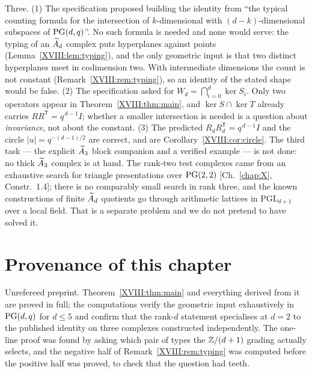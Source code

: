 \begin{remark}\label{XVIII:rem:corrections}
Three. (1) The specification proposed building the identity from ``the typical counting
formula for the intersection of $k$-dimensional with $(d-k)$-dimensional subspaces of
$\mathrm{PG}(d,q)$''. No such formula is needed and none would serve: the typing of an $\widetilde A_{d}$
complex puts hyperplanes against points (Lemma~\ref{XVIII:lem:typing}), and the only geometric
input is that two distinct hyperplanes meet in codimension two. With intermediate
dimensions the count is not constant (Remark~\ref{XVIII:rem:typing}), so an identity of the
stated shape would be false. (2) The specification asked for
$W_d=\bigcap_{i=0}^{d}\ker S_i$. Only two operators appear in Theorem~\ref{XVIII:thm:main}, and
$\ker S\cap\ker T$ already carries $RR^{\mathsf T}=q^{\,d-1}I$; whether a smaller
intersection is needed is a question about \emph{invariance}, not about the constant.
(3) The predicted $R_dR_d^{\mathsf T}=q^{\,d-1}I$ and the circle $|u|=q^{-(d-1)/2}$ are
correct, and are Corollary~\ref{XVIII:cor:circle}. The third task --- the explicit $\widetilde A_{3}$
block companion and a verified example --- is not done: no thick $\widetilde A_{3}$ complex is at
hand. The rank-two test complexes came from an exhaustive search for triangle
presentations over $\mathrm{PG}(2,2)$ [Ch.~\ref{chap:X}, Constr.~1.4]; there is no comparably small search in
rank three, and the known constructions of finite $\widetilde A_{d}$ quotients go through
arithmetic lattices in $\mathrm{PGL}_{d+1}$ over a local field. That is a separate problem
and we do not pretend to have solved it.
\end{remark}

\section*{Provenance of this chapter}

Unrefereed preprint. Theorem~\ref{XVIII:thm:main} and everything derived from it are proved in
full; the computations verify the geometric input exhaustively in $\mathrm{PG}(d,q)$ for $d\le5$
and confirm that the rank-$d$ statement specialises at $d=2$ to the published identity on
three complexes constructed independently. The one-line proof was found by asking which
pair of types the $\mathbb{Z}/(d+1)$ grading actually selects, and the negative half of
Remark~\ref{XVIII:rem:typing} was computed before the positive half was proved, to check that
the question had teeth.
